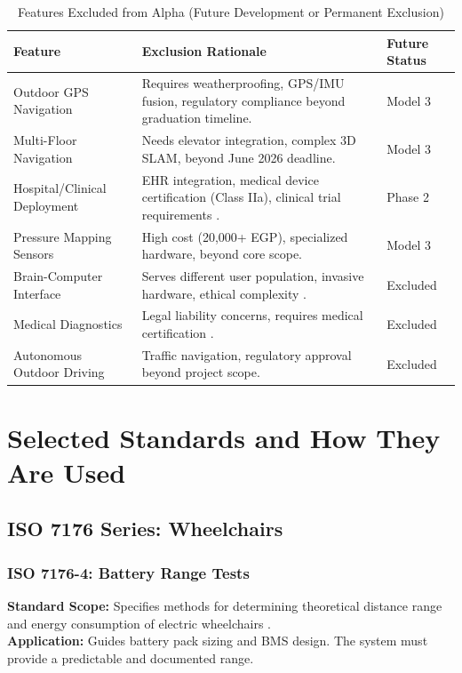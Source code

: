 \documentclass[12pt,a4paper]{report}
\renewcommand{\arraystretch}{1.45}
\renewcommand{\arraystretch}{1.3}
\begin{document}
\begin{table}[H]
\centering
\caption{Features Excluded from Alpha (Future Development or Permanent Exclusion)}
\label{tab:outscope}
{\renewcommand{\arraystretch}{1.5}
\begin{tabularx}{\textwidth}{@{}p{3cm}Xp{2.5cm}@{}}
\toprule
\textbf{Feature} & \textbf{Exclusion Rationale} & \textbf{Future Status} \\
\midrule
Outdoor GPS Navigation & Requires weatherproofing, GPS/IMU fusion, regulatory compliance beyond graduation timeline. & Model 3 \\
\midrule
Multi-Floor Navigation & Needs elevator integration, complex 3D SLAM, beyond June 2026 deadline. & Model 3 \\
\midrule
Hospital/Clinical Deployment & EHR integration, medical device certification (Class IIa), clinical trial requirements \cite{egypt_law_51}. & Phase 2 \\
\midrule
Pressure Mapping Sensors & High cost (20,000+ EGP), specialized hardware, beyond core scope. & Model 3 \\
\midrule
Brain-Computer Interface & Serves different user population, invasive hardware, ethical complexity \cite{meligy_bci}. & Excluded \\
\midrule
Medical Diagnostics & Legal liability concerns, requires medical certification \cite{egypt_law_51}. & Excluded \\
\midrule
Autonomous Outdoor Driving & Traffic navigation, regulatory approval beyond project scope. & Excluded \\
\bottomrule
\end{tabularx}}
\end{table}

\section{Selected Standards and How They Are Used}

\subsection{ISO 7176 Series: Wheelchairs}

\subsubsection{ISO 7176-4: Battery Range Tests}
\textbf{Standard Scope:} Specifies methods for determining theoretical distance range and energy consumption of electric wheelchairs \cite{iso7176_4}.\\
\textbf{Application:} Guides battery pack sizing and BMS design. The system must provide a predictable and documented range.
\end{document}
